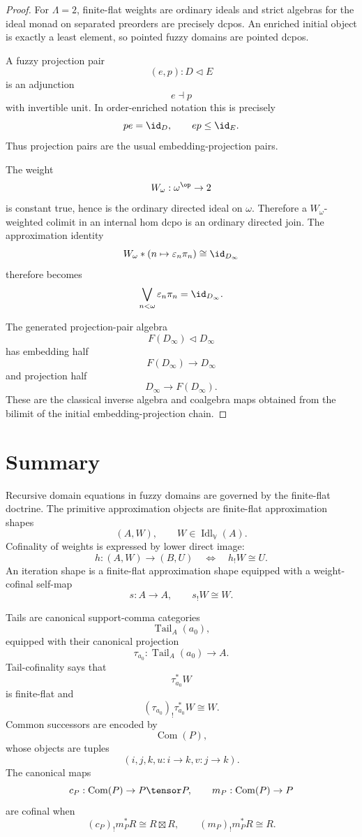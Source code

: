 \begin{proof}
For \(\Lambda=2\), finite-flat weights are ordinary ideals and strict algebras
for the ideal monad on separated preorders are precisely dcpos.  An enriched
initial object is exactly a least element, so pointed fuzzy domains are pointed
dcpos.

A fuzzy projection pair
\[
    (e,p):D\triangleleft E
\]
is an adjunction
\[
    e\dashv p
\]
with invertible unit.  In order-enriched notation this is precisely
\[
    pe=\id_D,
    \qquad
    ep\leq\id_E.
\]
Thus projection pairs are the usual embedding-projection pairs.

The weight
\[
    W_\omega:\omega^{\op}\to 2
\]
is constant true, hence is the ordinary directed ideal on \(\omega\).  Therefore
a \(W_\omega\)-weighted colimit in an internal hom dcpo is an ordinary directed
join.  The approximation identity
\[
    W_\omega*(n\mapsto\varepsilon_n\pi_n)
    \cong
    \id_{D_\infty}
\]
therefore becomes
\[
    \bigvee_{n<\omega}\varepsilon_n\pi_n
    =
    \id_{D_\infty}.
\]

The generated projection-pair algebra
\[
    F(D_\infty)\triangleleft D_\infty
\]
has embedding half
\[
    F(D_\infty)\to D_\infty
\]
and projection half
\[
    D_\infty\to F(D_\infty).
\]
These are the classical inverse algebra and coalgebra maps obtained from the
bilimit of the initial embedding-projection chain.
\end{proof}

\section{Summary}
\label{sec:summary-ff-rde}

Recursive domain equations in fuzzy domains are governed by the finite-flat
doctrine.  The primitive approximation objects are finite-flat approximation
shapes
\[
    (A,W),
    \qquad
    W\in\operatorname{Idl}_{\mathbb V}(A).
\]
Cofinality of weights is expressed by lower direct image:
\[
    h:(A,W)\to(B,U)
    \quad\Longleftrightarrow\quad
    h_!W\cong U.
\]
An iteration shape is a finite-flat approximation shape equipped with a
weight-cofinal self-map
\[
    s:A\to A,
    \qquad
    s_!W\cong W.
\]

Tails are canonical support-comma categories
\[
    \operatorname{Tail}_A(a_0),
\]
equipped with their canonical projection
\[
    \tau_{a_0}:\operatorname{Tail}_A(a_0)\to A.
\]
Tail-cofinality says that
\[
    \tau_{a_0}^*W
\]
is finite-flat and
\[
    (\tau_{a_0})_!\tau_{a_0}^{*}W\cong W.
\]
Common successors are encoded by
\[
    \operatorname{Com}(P),
\]
whose objects are tuples
\[
    (i,j,k,u:i\to k,v:j\to k).
\]
The canonical maps
\[
    c_P:\operatorname{Com}(P)\to P\tensor P,
    \qquad
    m_P:\operatorname{Com}(P)\to P
\]
are cofinal when
\[
    (c_P)_!m_P^*R\cong R\boxtimes R,
    \qquad
    (m_P)_!m_P^*R\cong R.
\]

